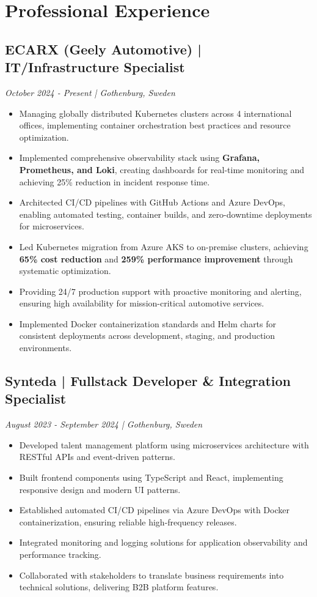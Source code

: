 \documentclass[10pt,a4paper]{article}
\begin{document}
\section*{Professional Experience}

\subsection*{ECARX (Geely Automotive) | IT/Infrastructure Specialist}
\textit{October 2024 - Present | Gothenburg, Sweden}
\begin{itemize}[noitemsep]
\item Managing globally distributed Kubernetes clusters across 4 international offices, implementing container orchestration best practices and resource optimization.
\item Implemented comprehensive observability stack using \textbf{Grafana, Prometheus, and Loki}, creating dashboards for real-time monitoring and achieving 25\% reduction in incident response time.
\item Architected CI/CD pipelines with GitHub Actions and Azure DevOps, enabling automated testing, container builds, and zero-downtime deployments for microservices.
\item Led Kubernetes migration from Azure AKS to on-premise clusters, achieving \textbf{65\% cost reduction} and \textbf{259\% performance improvement} through systematic optimization.
\item Providing 24/7 production support with proactive monitoring and alerting, ensuring high availability for mission-critical automotive services.
\item Implemented Docker containerization standards and Helm charts for consistent deployments across development, staging, and production environments.
\end{itemize}

\subsection*{Synteda | Fullstack Developer \& Integration Specialist}
\textit{August 2023 - September 2024 | Gothenburg, Sweden}
\begin{itemize}[noitemsep]
\item Developed talent management platform using microservices architecture with RESTful APIs and event-driven patterns.
\item Built frontend components using TypeScript and React, implementing responsive design and modern UI patterns.
\item Established automated CI/CD pipelines via Azure DevOps with Docker containerization, ensuring reliable high-frequency releases.
\item Integrated monitoring and logging solutions for application observability and performance tracking.
\item Collaborated with stakeholders to translate business requirements into technical solutions, delivering B2B platform features.
\end{itemize}
\end{document}
